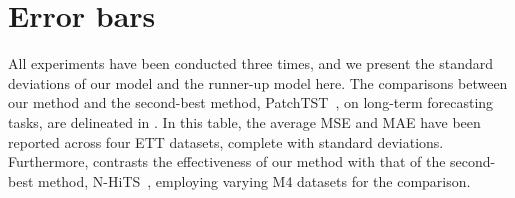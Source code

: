 \section{Error bars}\label{sec:error_bar}

All experiments have been conducted three times, and we present the standard deviations of our model and the runner-up model here. The comparisons between our method and the second-best method, PatchTST~\citep{nie2022time}, on long-term forecasting tasks, are delineated in . In this table, the average MSE and MAE have been reported across four ETT datasets, complete with standard deviations. Furthermore,  contrasts the effectiveness of our method with that of the second-best method, N-HiTS~\citep{challu2022nhits}, employing varying M4 datasets for the comparison.



